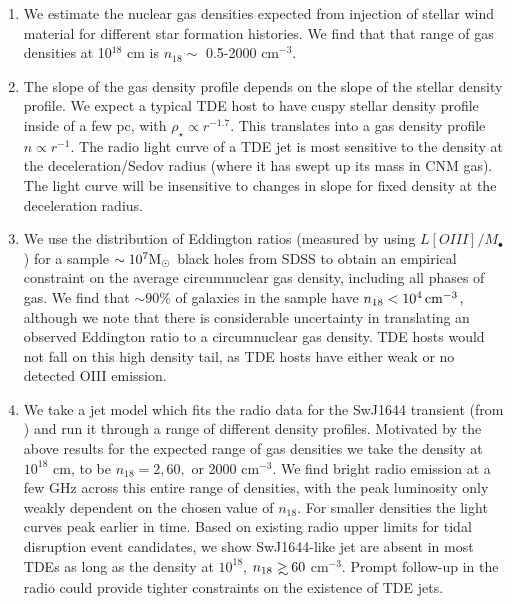 \documentclass[usenatbib,fleqn]{mnras}
\newcommand\gsim{\mathrel{\rlap{\lower4pt\hbox{\hskip1pt$\sim$}}
    \raise1pt\hbox{$>$}}}
\newcommand{\Mbh}[1][]{M_{\bullet#1}}
\newcommand{\Msun}{{\rm M_\odot}}
\begin{document}
\begin{enumerate}
\item We estimate the nuclear gas densities expected from injection of
  stellar wind material for different star formation histories. We
  find that that range of gas densities at 10$^{18}$ cm is $n_{18}
  \sim$ 0.5-2000 cm$^{-3}$.

\item The slope of the gas density profile depends on the slope of the
  stellar density profile. We expect a typical TDE host to have cuspy
  stellar density profile inside of a few pc, with $\rho_\star
  \propto r^{-1.7}$. This translates into a gas density profile $n
  \propto r^{-1}$. The radio light curve of a TDE jet is most
  sensitive to the density at the deceleration/Sedov radius (where it
  has swept up its mass in CNM gas). The light curve will be
  insensitive to changes in slope for fixed density at the
  deceleration radius.

\item We use the distribution of Eddington ratios (measured by
  \citealt{Kauffmann&Heckman2009} using $L[OIII]/\Mbh$) for a sample
  $\sim 10^{7} \Msun$ black holes from SDSS to obtain an empirical
  constraint on the average circumnuclear gas density, including all
  phases of gas. We find that $\sim90\%$ of galaxies in the sample
  have $n_{18}<10^{4} \, {\rm cm}^{-3}$, although we note that there is
  considerable uncertainty in translating an observed Eddington ratio
  to a circumnuclear gas density. TDE hosts would not fall on this
  high density tail, as TDE hosts have either weak or no detected OIII
  emission.

\item We take a jet model which fits the radio data for the SwJ1644
  transient (from \citealt{Mimica+2015}) and run it through a range of
  different density profiles. Motivated by the above results for the
  expected range of gas densities we take the density at $10^{18}$ cm,
  to be $n_{18}=2, 60,$ or 2000 cm$^{-3}$. We find bright radio
  emission at a few GHz across this entire range of densities, with
  the peak luminosity only weakly dependent on the chosen value of
  $n_{18}$.  For smaller densities the light curves peak earlier in
  time. Based on existing radio upper limits for tidal disruption
  event candidates, we show SwJ1644-like jet are absent in most TDEs
  as long as the density at $10^{18}$, $n_{18} \gsim  60$
  cm$^{-3}$. Prompt follow-up in the radio could provide tighter
  constraints on the existence of TDE jets.  
\end{enumerate}
\end{document}
